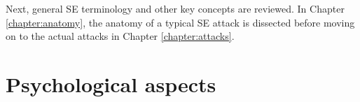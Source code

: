 Next, general SE terminology and other key concepts are reviewed. In Chapter \ref{chapter:anatomy}, the anatomy of a typical SE attack is dissected before moving on to the actual attacks in Chapter \ref{chapter:attacks}.









\section{Psychological aspects}
\begin{comment}

    - Influence
        - Six Weapons of Influence
            - Reciprocity
            - Commitment and consistency
            - Social proof
            - Liking
            - Authority
            - Scarcity
        - Cialdini Influence Science and Practice 1993
    - Hatfield's three concepts
        - Epistemic asymmetry
        - Technocratic dominance
        - Teleological replacement
        
\end{comment}

